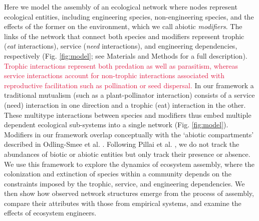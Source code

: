 \documentclass[twocolumn,preprintnumbers,amsmath,amssymb,superscriptaddress,linenumbers]{revtex4-1}
\newcommand{\rev}[1]{\textcolor{crimson}{#1}}
\begin{document}
Here we model the assembly of an ecological network where nodes represent ecological entities, including engineering species, non-engineering species, and the effects of the former on the environment, which we call abiotic \emph{modifiers}.
The links of the network that connect both species and modifiers represent trophic (\emph{eat} interactions), service (\emph{need} interactions), and engineering dependencies, respectively (Fig. \ref{fig:model}; see Materials and Methods for a full description).
\rev{Trophic interactions represent both predation as well as parasitism, whereas service interactions account for non-trophic interactions associated with reproductive facilitation such as pollination or seed dispersal.}
In our framework a traditional mutualism (such as a plant-pollinator interaction) consists of a service (need) interaction in one direction and a trophic (eat) interaction in the other.
These multitype interactions between species and modifiers thus embed multiple dependent ecological sub-systems into a single network (Fig. \ref{fig:model}). %
Modifiers in our framework overlap conceptually with the `abiotic compartments' described in Odling-Smee et al. \cite{OdlingSmee2013}.
Following Pillai et al. \cite{Pillai2011}, we do not track the abundances of biotic or abiotic entities but only track their presence or absence.
We use this framework to explore the dynamics of ecosystem assembly, where the colonization and extinction of species within a community depends on the constraints imposed by the trophic, service, and engineering dependencies.
We then show how observed network structures emerge from the process of assembly, compare their attributes with those from empirical systems, and examine the effects of ecosystem engineers.
\end{document}
